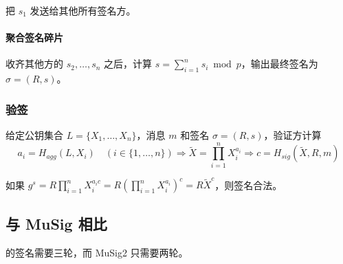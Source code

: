 \documentclass[a4paper,10pt]{article}
\begin{document}
把 \(s_1\) 发送给其他所有签名方。

\paragraph{聚合签名碎片} 收齐其他方的 \(s_2,\dots,s_n\) 之后，计算 \(s=\sum_{i=1}^n s_i\bmod p\)，输出最终签名为 \(\sigma=(R,s)\)。

\subsubsection{验签}
给定公钥集合 \(L=\{X_1,\dots,X_n\}\)，消息 \(m\) 和签名 \(\sigma=(R,s)\)，验证方计算
\[
  a_i=H_{agg}(L,X_i) \quad (i\in\{1,\dots,n\}) \Rightarrow \tilde{X}=\prod_{i=1}^n X_i^{a_i} \Rightarrow c=H_{sig}(\tilde{X},R,m)
\]
 
如果 \(g^s = R\prod_{i=1}^n X_i^{a_i c} = R(\prod_{i=1}^n X_i^{a_i})^c = R\tilde{X}^c\)，则签名合法。

\subsection{与 MuSig 相比}
\cite{cryptoeprint:2018:068} 的签名需要三轮，而 MuSig2 只需要两轮。



\end{document}
